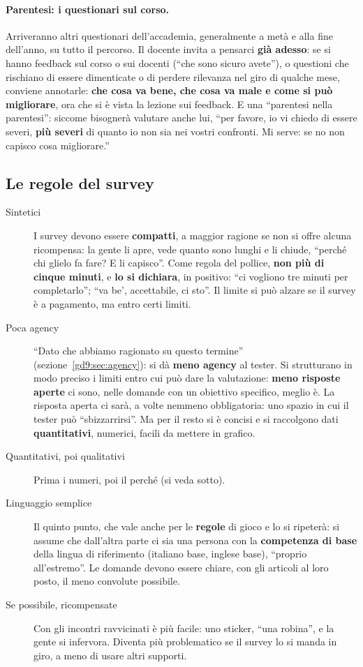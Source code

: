 \paragraph{Parentesi: i questionari sul corso.} Arriveranno altri
questionari dell'accademia, generalmente a metà e alla fine dell'anno, su
tutto il percorso. Il docente invita a pensarci \textbf{già adesso}: se si
hanno feedback sul corso o sui docenti (``che sono sicuro avete''), o
questioni che rischiano di essere dimenticate o di perdere rilevanza nel
giro di qualche mese, conviene annotarle: \textbf{che cosa va bene, che
cosa va male e come si può migliorare}, ora che si è vista la lezione sui
feedback. E una ``parentesi nella parentesi'': siccome bisognerà valutare
anche lui, ``per favore, io vi chiedo di essere severi, \textbf{più severi}
di quanto io non sia nei vostri confronti. Mi serve: se no non capisco cosa
migliorare.''

\subsection{Le regole del survey}

\begin{description}
  \item[Sintetici] I survey devono essere \textbf{compatti}, a maggior
        ragione se non si offre alcuna ricompensa: la gente li apre, vede
        quanto sono lunghi e li chiude, ``perché chi glielo fa fare? E li
        capisco''. Come regola del pollice, \textbf{non più di cinque
        minuti}, e \textbf{lo si dichiara}, in positivo: ``ci vogliono tre
        minuti per completarlo''; ``va be', accettabile, ci sto''. Il limite
        si può alzare se il survey è a pagamento, ma entro certi limiti.
  \item[Poca agency] ``Dato che abbiamo ragionato su questo termine''
        (sezione~\ref{gd9:sec:agency}): si dà \textbf{meno agency} al
        tester. Si strutturano in modo preciso i limiti entro cui può dare
        la valutazione: \textbf{meno risposte aperte} ci sono, nelle domande
        con un obiettivo specifico, meglio è. La risposta aperta ci sarà, a
        volte nemmeno obbligatoria: uno spazio in cui il tester può
        ``sbizzarrirsi''. Ma per il resto si è concisi e si raccolgono dati
        \textbf{quantitativi}, numerici, facili da mettere in grafico.
  \item[Quantitativi, poi qualitativi] Prima i numeri, poi il perché (si
        veda sotto).
  \item[Linguaggio semplice] Il quinto punto, che vale anche per le
        \textbf{regole} di gioco e lo si ripeterà: si assume che dall'altra
        parte ci sia una persona con la \textbf{competenza di base} della
        lingua di riferimento (italiano base, inglese base), ``proprio
        all'estremo''. Le domande devono essere chiare, con gli articoli al
        loro posto, il meno convolute possibile.
  \item[Se possibile, ricompensate] Con gli incontri ravvicinati è più
        facile: uno sticker, ``una robina'', e la gente si infervora.
        Diventa più problematico se il survey lo si manda in giro, a meno di
        usare altri supporti.
\end{description}

